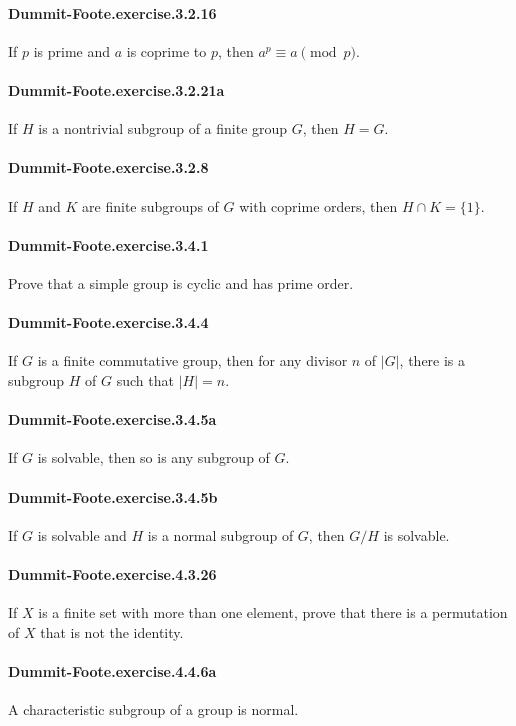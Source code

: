\documentclass{article}
\begin{document}
\paragraph{Dummit-Foote.exercise.3.2.16} If $p$ is prime and $a$ is coprime to $p$, then $a^p\equiv a\pmod{p}$.

\paragraph{Dummit-Foote.exercise.3.2.21a} If $H$ is a nontrivial subgroup of a finite group $G$, then $H=G$.

\paragraph{Dummit-Foote.exercise.3.2.8} If $H$ and $K$ are finite subgroups of $G$ with coprime orders, then $H\cap K = \{1\}$.

\paragraph{Dummit-Foote.exercise.3.4.1} Prove that a simple group is cyclic and has prime order.

\paragraph{Dummit-Foote.exercise.3.4.4} If $G$ is a finite commutative group, then for any divisor $n$ of $|G|$, there is a subgroup $H$ of $G$ such that $|H|=n$.

\paragraph{Dummit-Foote.exercise.3.4.5a} If $G$ is solvable, then so is any subgroup of $G$.

\paragraph{Dummit-Foote.exercise.3.4.5b} If $G$ is solvable and $H$ is a normal subgroup of $G$, then $G/H$ is solvable.

\paragraph{Dummit-Foote.exercise.4.3.26} If $X$ is a finite set with more than one element, prove that there is a permutation of $X$ that is not the identity.

\paragraph{Dummit-Foote.exercise.4.4.6a} A characteristic subgroup of a group is normal.
\end{document}
